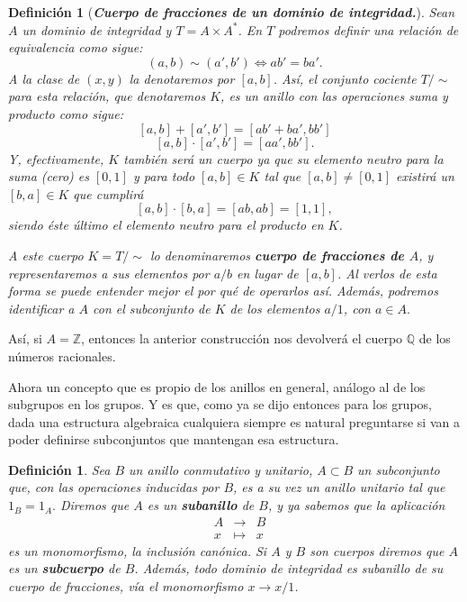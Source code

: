 \documentclass[12pt]{article}
\newtheorem{definition}[theorem]{Definición}
\begin{document}
\begin{definition}[\textbf{\textit{Cuerpo de fracciones de un dominio de integridad.}}] Sean $A$ un dominio de integridad y $T = A \times A^{\ast}$. En $T$ podremos definir una relación de equivalencia como sigue: $$(a,b)\sim (a',b') \Leftrightarrow ab' = ba'.$$ A la clase de $(x,y)$ la denotaremos por $[a,b]$. Así, el conjunto cociente $T/ \sim$ para esta relación, que denotaremos $K$, es un anillo con las operaciones suma y producto como sigue: $$[a,b]+[a',b'] = [ab' + ba', bb']$$
$$[a,b]\cdot[a',b'] = [aa', bb'].$$
Y, efectivamente, $K$ también será un cuerpo ya que su elemento neutro para la suma (cero) es $[0,1]$ y para todo $[a,b] \in K$ tal que $[a,b] \neq [0,1]$ existirá un $[b,a] \in K$ que cumplirá $$[a,b] \cdot [b,a] = [ab, ab] = [1,1],$$ siendo éste último el elemento neutro para el producto en $K$.

A este cuerpo $K = T/\sim$ lo denominaremos \textbf{cuerpo de fracciones de $A$}, y representaremos a sus elementos por $a/b$ en lugar de $[a,b]$. Al verlos de esta forma se puede entender mejor el por qué de operarlos así. Además, podremos identificar a $A$ con el subconjunto de $K$ de los elementos $a/1$, con $a \in A.$
\end{definition}

Así, si $A = \mathbb{Z}$, entonces la anterior construcción nos devolverá el cuerpo $\mathbb{Q}$ de los números racionales.

Ahora un concepto que es propio de los anillos en general, análogo al de los subgrupos en  los grupos. Y es que, como ya se dijo entonces para los grupos, dada una estructura algebraica cualquiera siempre es natural preguntarse si van a poder definirse subconjuntos que mantengan esa estructura. 

\begin{definition} Sea $B$ un anillo conmutativo y unitario, $A \subset B$ un subconjunto que, con las operaciones inducidas por $B$, es a su vez un anillo unitario tal que $1_{B} =1_{A}.$ Diremos que $A$ es un \textbf{subanillo} de $B$, y ya sabemos que la aplicación
$$\begin{array}{rccl}
&A&\longrightarrow &B \\
&x& \longmapsto &x
\end{array}
$$  es un monomorfismo, la inclusión canónica. Si $A$ y $B$ son cuerpos diremos que $A$ es un \textbf{subcuerpo} de $B$. Además, todo dominio de integridad es subanillo de su cuerpo de fracciones, vía el monomorfismo $x \longrightarrow x/1$.
\end{definition}
\end{document}
